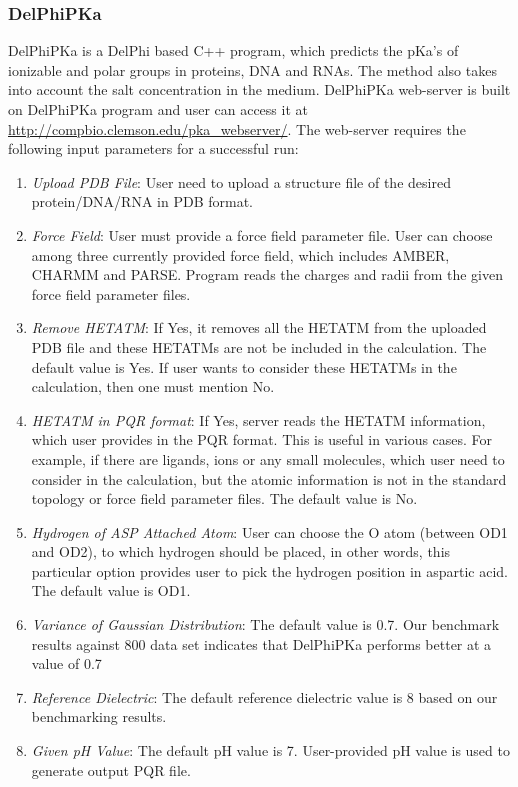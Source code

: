 \documentclass[9pt,tutorial,pubversion]{livecoms}
\begin{document}
\subsubsection{DelPhiPKa}
DelPhiPKa\cite{wang2015pka} is a DelPhi based C++ program, which predicts the pKa’s of ionizable and polar groups in proteins, DNA and RNAs. The method also takes into account the salt concentration in the medium\cite{pahari2018delphipka}. DelPhiPKa web-server is built on DelPhiPKa program and user can access it at \url{http://compbio.clemson.edu/pka_webserver/}. The web-server requires the following input parameters for a successful run:
\begin{enumerate}
    \item \textit{ Upload PDB File}: User need to upload a structure file of the desired protein/DNA/RNA in PDB format.
    \item \textit{ Force Field}: User must provide a force field parameter file. User can choose among three currently provided force field, which includes AMBER, CHARMM and PARSE. Program reads the charges and radii from the given force field parameter files.
    \item \textit{ Remove HETATM}: If Yes, it removes all the HETATM from the uploaded PDB file and these HETATMs are not be included in the calculation. The default value is Yes. If user wants to consider these HETATMs in the calculation, then one must mention No.
    \item \textit{ HETATM in PQR format}: If Yes, server reads the HETATM information, which user provides in the PQR format. This is useful in various cases. For example, if there are ligands, ions or any small molecules, which user need to consider in the calculation, but the atomic information is not in the standard topology or force field parameter files. The default value is No. 
    \item \textit{ Hydrogen of ASP Attached Atom}: User can choose the O atom (between OD1 and OD2), to which hydrogen should be placed, in other words, this particular option provides user to pick the hydrogen position in aspartic acid. The default value is OD1.
    \item \textit{ Variance of Gaussian Distribution}: The default value is 0.7. Our benchmark results against 800 data set indicates that DelPhiPKa performs better at a value of 0.7 
    \item \textit{ Reference Dielectric}: The default reference dielectric value is 8 based on our benchmarking results. 
    \item \textit{ Given pH Value}: The default pH value is 7. User-provided pH value is used to generate output PQR file.

\end{enumerate}
\end{document}
